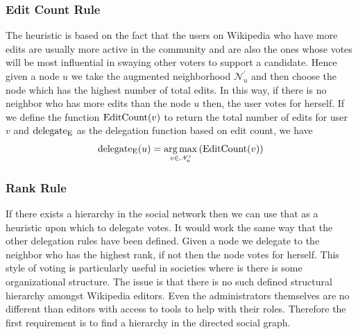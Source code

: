 \subsubsection{Edit Count Rule}
The heuristic is based on the fact that the users on Wikipedia who have more edits are usually more active in the community and are also the ones whose votes will be most influential in swaying other voters to support a candidate. Hence given a node $u$ we take the augmented neighborhood $\mathcal{N}_u^{\prime}$ and then choose the node which has the highest number of total edits. In this way, if there is no neighbor who has more edits than the node $u$ then, the user votes for herself. If we define the function $\operatorname*{EditCount}(v)$ to return the total number of edits for user $v$ and $\operatorname*{delegate_E}$ as the delegation function based on edit count, we have 
\[\operatorname*{delegate_E}(u)  = \operatorname*{arg\,max}_{v \in \mathcal{N}_u^\prime} \left(\operatorname*{EditCount}(v) \right)\]

\subsubsection{Rank Rule}
If there exists a hierarchy in the social network then we can use that as a heuristic upon which to delegate votes. It would work the same way that the other delegation rules have been defined. Given a node we delegate to the neighbor who has the highest rank, if not then the node votes for herself. This style of voting is particularly useful in societies where is there is some organizational structure. The issue is that there is no such defined structural hierarchy amongst Wikipedia editors. Even the administrators themselves are no different than editors with access to tools to help with their roles. Therefore the first requirement is to find a hierarchy in the directed social graph.
\smallskip

